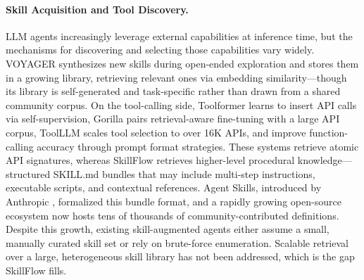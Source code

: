 \documentclass[11pt]{article}
\begin{document}
\paragraph{Skill Acquisition and Tool Discovery.}
LLM agents increasingly leverage external capabilities at inference time, but the mechanisms for discovering and selecting those capabilities vary widely.
VOYAGER \citep{wang_voyager_2023} synthesizes new skills during open-ended exploration and stores them in a growing library, retrieving relevant ones via embedding similarity---though its library is self-generated and task-specific rather than drawn from a shared community corpus.
On the tool-calling side, Toolformer \citep{schick2023toolformer} learns to insert API calls via self-supervision, Gorilla \citep{patil2024gorilla} pairs retrieval-aware fine-tuning with a large API corpus, ToolLLM \citep{qin2024toolllm} scales tool selection to over 16K APIs, and \citet{chen-etal-2025-enhancing} improve function-calling accuracy through prompt format strategies.
These systems retrieve atomic API signatures, whereas SkillFlow retrieves higher-level procedural knowledge---structured SKILL.md bundles that may include multi-step instructions, executable scripts, and contextual references.
Agent Skills, introduced by Anthropic \citep{noauthor_overview_nodate}, formalized this bundle format, and a rapidly growing open-source ecosystem now hosts tens of thousands of community-contributed definitions.
Despite this growth, existing skill-augmented agents either assume a small, manually curated skill set or rely on brute-force enumeration. Scalable retrieval over a large, heterogeneous skill library has not been addressed, which is the gap SkillFlow fills.
\end{document}
